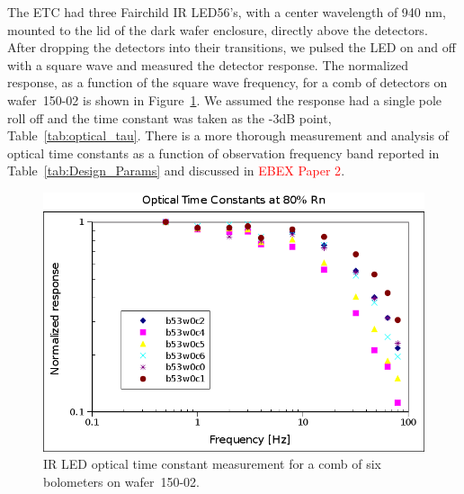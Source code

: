 

%


The \ac{ETC} had three Fairchild IR LED56's, with a center wavelength of 940 nm, mounted to the lid of the dark wafer enclosure, directly above the detectors. 
After dropping the detectors into their transitions, we pulsed the LED on and off with a square wave and measured the detector response. 
The normalized response, as a function of the square wave frequency, for a comb of detectors on wafer~150-02 is shown in Figure~\ref{fig:led_tau}.
We assumed the response had a single pole roll off and the time constant was taken as the -3dB point, Table~\ref{tab:optical_tau}. 
There is a more thorough measurement and analysis of optical time constants as a function of observation frequency band reported in Table~\ref{tab:Design_Params} and discussed in \textcolor{red}{EBEX Paper 2}. 

\begin{figure}[htp]
\begin{center}
\includegraphics[width=0.48\columnwidth]{figures/b53w0_ir_led_tau.png}
\caption{IR LED optical time constant measurement for a comb of six bolometers on wafer~150-02. 
\label{fig:led_tau} }
\end{center}
\end{figure}

